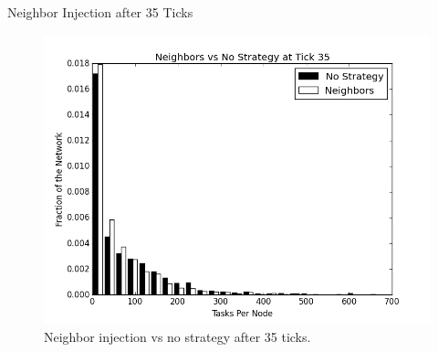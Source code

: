 \documentclass[11pt]{beamer}
\begin{document}
%
%
%
%

\begin{frame}{Neighbor Injection after 35 Ticks}
\begin{figure}
	\centering
	\includegraphics[width=0.7\linewidth]{figs/neighborsStableHist35}
	\caption[Neighbor injection  vs no strategy after 35 ticks.]{Neighbor injection  vs no strategy after 35 ticks.}
	\label{fig:neighborsStableHist35}
\end{figure}

\end{frame}

\end{document}
